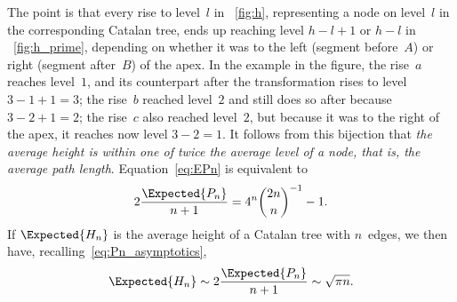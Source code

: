 The point is that every rise to level~\(l\) in \fig~\ref{fig:h},
representing a node on level~\(l\) in the corresponding Catalan tree,
ends up reaching level $h-l+1$ or $h-l$ in \fig~\ref{fig:h_prime},
depending on whether it was to the left (segment before~$A$) or right
(segment after~$B$) of the apex.  In the example in the figure, the
rise~$a$ reaches level~$1$, and its counterpart after the
transformation rises to level \(3-1+1=3\); the rise~$b$ reached
level~$2$ and still does so after because \(3-2+1=2\); the rise~$c$
also reached level~$2$, but because it was to the right of the apex,
it reaches now level \(3-2=1\). It follows from this bijection that
\emph{the average height is within one of twice the average level of a
node, that is, the average path length}. Equation~\eqref{eq:EPn} is
equivalent to
\begin{equation*}
2\frac{\Expected{P_n}}{n+1} = 4^{n}\binom{2n}{n}^{-1} - 1.
\end{equation*}
If \(\Expected{H_n}\) is the average height of a Catalan tree with
\(n\)~edges, we then have, recalling~\eqref{eq:Pn_asymptotics},
\begin{equation*}
\Expected{H_n} \sim 2\frac{\Expected{P_n}}{n+1} \sim \sqrt{\pi n}.
\end{equation*}

